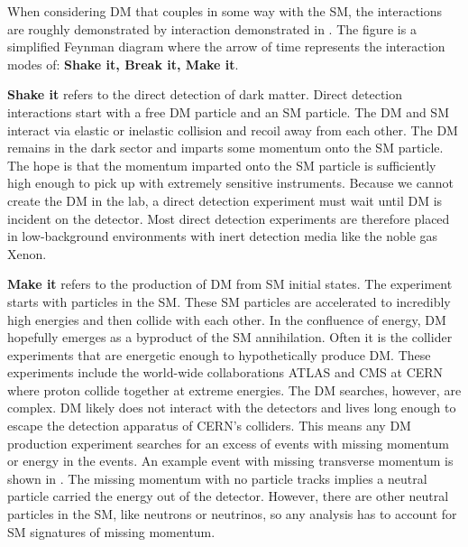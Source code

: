 When considering DM that couples in some way with the SM, the interactions are roughly demonstrated by interaction demonstrated in .
The figure is a simplified Feynman diagram where the arrow of time represents the interaction modes of: \textbf{Shake it, Break it, Make it}.

\textbf{Shake it} refers to the direct detection of dark matter.
Direct detection interactions start with a free DM particle and an SM particle.
The DM and SM interact via elastic or inelastic collision and recoil away from each other.
The DM remains in the dark sector and imparts some momentum onto the SM particle.
The hope is that the momentum imparted onto the SM particle is sufficiently high enough to pick up with extremely sensitive instruments.
Because we cannot create the DM in the lab, a direct detection experiment must wait until DM is incident on the detector.
Most direct detection experiments are therefore placed in low-background environments with inert detection media like the noble gas Xenon. \cite{Cooley:dd_dm}

\textbf{Make it} refers to the production of DM from SM initial states.
The experiment starts with particles in the SM.
These SM particles are accelerated to incredibly high energies and then collide with each other.
In the confluence of energy, DM hopefully emerges as a byproduct of the SM annihilation.
Often it is the collider experiments that are energetic enough to hypothetically produce DM.
These experiments include the world-wide collaborations ATLAS and CMS at CERN where proton collide together at extreme energies.
The DM searches, however, are complex.
DM likely does not interact with the detectors and lives long enough to escape the detection apparatus of CERN's colliders.
This means any DM production experiment searches for an excess of events with missing momentum or energy in the events.
An example event with missing transverse momentum is shown in .
The missing momentum with no particle tracks implies a neutral particle carried the energy out of the detector.
However, there are other neutral particles in the SM, like neutrons or neutrinos, so any analysis has to account for SM signatures of missing momentum. \cite{atlas:met_dm_precise}

